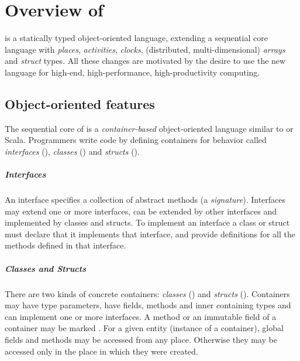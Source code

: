 \chapter{Overview of \Xten}

\Xten{} is a statically typed object-oriented language, extending a
sequential core language with 
\emph{places}, \emph{activities}, \emph{clocks},
(distributed, multi-dimensional) \emph{arrays} and \emph{struct}
types. All these changes are motivated by the desire to use the new
language for high-end, high-performance, high-productivity computing.

\section{Object-oriented features}

The sequential core of \Xten{} is a {\em container-based} object-oriented language
similar to \java{} or Scala.
Programmers write \Xten{} code by defining containers for behavior called
\emph{interfaces}
(),
\emph{classes}
() and
\emph{structs}
().


\paragraph{Interfaces}

An \Xten{} interface specifies a collection of abstract methods (a
{\em signature}). Interfaces may extend one or more interfaces, can be
extended by other interfaces and implemented by classes and structs.
To implement an interface a class or struct must declare that it
implements that interface, and provide definitions for all the methods
defined in that interface.

\paragraph{Classes and Structs}

There are two kinds of concrete containers: \emph{classes}
() and \emph{structs}
(). Containers may have type parameters, have fields,
methods and inner containing types and can implement one or more
interfaces. A method or an immutable field of a
container may be marked .  For a given entity (instance of
a container), global fields and methods may be accessed from any
place. Otherwise they may be accessed only in the place in which they
were created.

